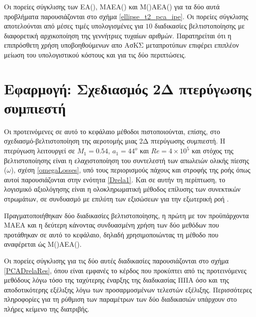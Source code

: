 Οι πορείες σύγκλισης των ΕΑ(),    ΜΑΕΑ() και \linebreak Μ()ΑΕΑ() για τα δύο αυτά προβλήματα παρουσιάζονται στο σχήμα \ref{ellipse_t2_pca_ipe}. Οι πορείες σύγκλισης αποτελούνται από μέσες τιμές υπολογισμένες για $10$ διαδικασίες βελτιστοποίησης με διαφορετική αρχικοποίηση της γεννήτριες τυχαίων αριθμών.  Παρατηρείται ότι η επιπρόσθετη χρήση υποβοηθούμενων απο ΑσΚΣ μεταπροτύπων επιφέρει επιπλέον μείωση του υπολογιστικού κόστους και για τις δύο περιπτώσεις.


\section{Εφαρμογή: Σχεδιασμός 2Δ πτερύγωσης συμπιεστή}
Οι προτεινόμενες σε αυτό το κεφάλαιο μέθοδοι πιστοποιούνται, επίσης, στο σχεδιασμό-βελτιστοποίηση της αεροτομής μιας 2Δ πτερύγωσης συμπιεστή. Η πτερύγωση λειτουργεί σε $M_1=0.54$, $a_1=44^o$ και $Re=4\!\times\!10^5$ και στόχος της βελτιστοποίησης είναι η ελαχιστοποίηση του συντελεστή των απωλειών ολικής πίεσης ($\omega$), σχέση \ref{omegaLosses}, υπό τους περιορισμούς πάχους και στροφής της ροής όπως αυτοί παρουσιάζονται στην ενότητα \ref{Drela1}. Και σε αυτήν τη περίπτωση, το λογισμικό αξιολόγησης είναι η ολοκληρωματική μέθοδος επίλυσης των συνεκτικών στρωμάτων, σε συνδυασμό με επιλύτη των εξισώσεων  για την εξωτερική ροή \cite{Drel1987}. 

Πραγματοποιήθηκαν δύο διαδικασίες βελτιστοποίησης, η πρώτη με τον προϋπάρχοντα ΜΑΕΑ και η δεύτερη κάνοντας συνδυασμένη χρήση των δύο μεθόδων που προτάθηκαν σε αυτό το κεφάλαιο, δηλαδή χρησιμοποιώντας τη μέθοδο που αναφέρεται ώς Μ()ΑΕΑ(). 
   
Οι πορείες σύγκλισης για τις δύο αυτές διαδικασίες παρουσιάζονται στο σχήμα \ref{PCADrelaRes}, όπου είναι εμφανές το κέρδος που προκύπτει από τις προτεινόμενες μεθόδους λόγω τόσο της ταχύτερης έναρξης της διαδικασίας ΠΠΑ όσο και της αποδοτικότερης εξέλιξης λόγω των προσαρμοσμένων τελεστών εξέλιξης. Περισσότερες πληροφορίες για τη ρύθμιση των παραμέτρων των δύο διαδικασιών υπάρχουν στο πλήρες κείμενο της διατριβής.   
  
